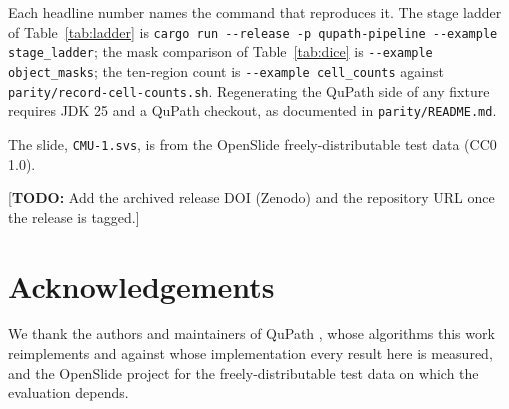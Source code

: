 \documentclass[11pt,a4paper]{article}
\newcommand{\todo}[1]{{\color{red}\small[\textbf{TODO:} #1]}}
\newcommand{\todo}[1]{}
\begin{document}
Each headline number names the command that reproduces it. The stage ladder of
Table~\ref{tab:ladder} is \texttt{cargo run -{}-release -p qupath-pipeline
-{}-example stage\_ladder}; the mask comparison of Table~\ref{tab:dice} is
\texttt{-{}-example object\_masks}; the ten-region count is
\texttt{-{}-example cell\_counts} against
\texttt{parity/record-cell-counts.sh}. Regenerating the QuPath side of any
fixture requires JDK 25 and a QuPath checkout, as documented in
\texttt{parity/README.md}.

The slide, \texttt{CMU-1.svs}, is from the OpenSlide freely-distributable test
data (CC0 1.0).

\todo{Add the archived release DOI (Zenodo) and the repository URL once the
release is tagged.}

\section*{Acknowledgements}

We thank the authors and maintainers of QuPath \cite{bankhead2017qupath}, whose
algorithms this work reimplements and against whose implementation every result
here is measured, and the OpenSlide project \cite{goode2013openslide} for the
freely-distributable test data on which the evaluation depends.



\end{document}
